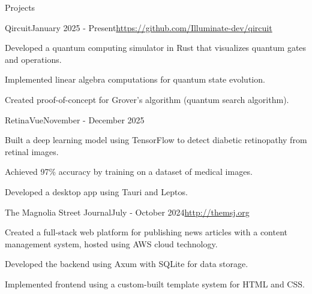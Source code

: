 \documentclass[
	11pt, %
]{resume} %
\begin{document}
\begin{rSection}{Projects}

	\begin{rSubsection}{Qircuit}{January 2025 - Present}{\href{https://github.com/Illuminate-dev/qircuit}{\textnormal{https://github.com/Illuminate-dev/qircuit}}}{}
		\item Developed a quantum computing simulator in Rust that visualizes quantum gates and operations. 
		\item Implemented linear algebra computations for quantum state evolution.
		\item Created proof-of-concept for Grover’s algorithm (quantum search algorithm).
	\end{rSubsection}


	\begin{rSubsection}{RetinaVue}{November - December 2025}{}{}
		\item Built a deep learning model using TensorFlow to detect diabetic retinopathy from retinal images.
		\item Achieved 97\% accuracy by training on a dataset of medical images.
		\item Developed a desktop app using Tauri and Leptos.
	\end{rSubsection}


	\begin{rSubsection}{The Magnolia Street Journal}{July - October 2024}{\href{http://themsj.org}{\textnormal{http://themsj.org}}}{}
		\item Created a full-stack web platform for publishing news articles with a content management system, hosted using AWS cloud technology.
		\item Developed the backend using Axum with SQLite for data storage.
		\item Implemented frontend using a custom-built template system for HTML and CSS.
	\end{rSubsection}

\end{rSection}

\end{document}

